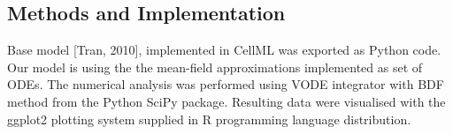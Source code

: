 \documentclass[a0,portrait]{a0poster}
\begin{document}
\begin{multicols}{2}
%




\section*{Methods and Implementation}

Base model [Tran, 2010], implemented in CellML was exported as Python
code. Our model is using the the mean-field approximations implemented as
set of ODEs. The numerical analysis was performed using VODE integrator
with BDF method from the Python SciPy package. Resulting data were
visualised with the ggplot2 plotting system supplied in R programming
language distribution.


\end{multicols}
\end{document}
